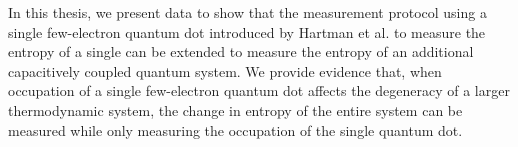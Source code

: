 
In this thesis, we present data to show that the measurement protocol using a single few-electron quantum dot introduced by Hartman et al. to measure the entropy of a single \spinh can be extended to measure the entropy of an additional capacitively coupled quantum system. We provide evidence that, when occupation of a single few-electron quantum dot affects the degeneracy of a larger thermodynamic system, the change in entropy of the entire system can be measured while only measuring the occupation of the single quantum dot. 
\endinput